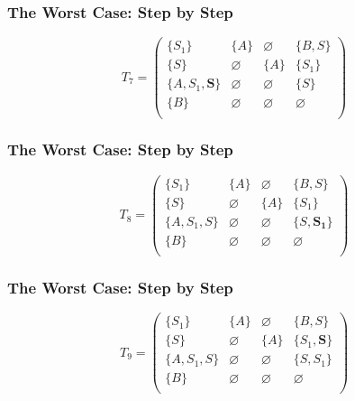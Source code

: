\documentclass[xcolor=table]{beamer}
\begin{document}
\begin{frame}[noframenumbering]

  \frametitle{The Worst Case: Step by Step}
\begin{figure}[h]
\[
T_7 = \begin{pmatrix}
\{S_1\}     & \{A\}       & \varnothing & \{B, S\}    \\
\{S\}       & \varnothing & \{A\}       & \{S_1\}     \\
\{A, S_1, \pmb{S}\}  & \varnothing & \varnothing & \{S\}    \\
\{B\}       & \varnothing & \varnothing & \varnothing \\
\end{pmatrix}
\]
\label{ExampleQueryFirstIteration}
\end{figure}
\end{frame}

\begin{frame}[noframenumbering]

  \frametitle{The Worst Case: Step by Step}
\begin{figure}[h]
\[
T_8 = \begin{pmatrix}
\{S_1\}     & \{A\}       & \varnothing & \{B, S\}    \\
\{S\}       & \varnothing & \{A\}       & \{S_1\}     \\
\{A, S_1, S\}  & \varnothing & \varnothing & \{S, \pmb{S_1}\} \\
\{B\}       & \varnothing & \varnothing & \varnothing \\
\end{pmatrix}
\]
\label{ExampleQueryFirstIteration}
\end{figure}
\end{frame}

\begin{frame}[noframenumbering]

  \frametitle{The Worst Case: Step by Step}
\begin{figure}[h]
\[
T_9 = \begin{pmatrix}
\{S_1\}     & \{A\}       & \varnothing & \{B, S\}    \\
\{S\}       & \varnothing & \{A\}       & \{S_1, \pmb{S}\}     \\
\{A, S_1, S\}  & \varnothing & \varnothing & \{S, S_1\} \\
\{B\}       & \varnothing & \varnothing & \varnothing \\
\end{pmatrix}
\]
\label{ExampleQueryFirstIteration}
\end{figure}
\end{frame}
\end{document}
